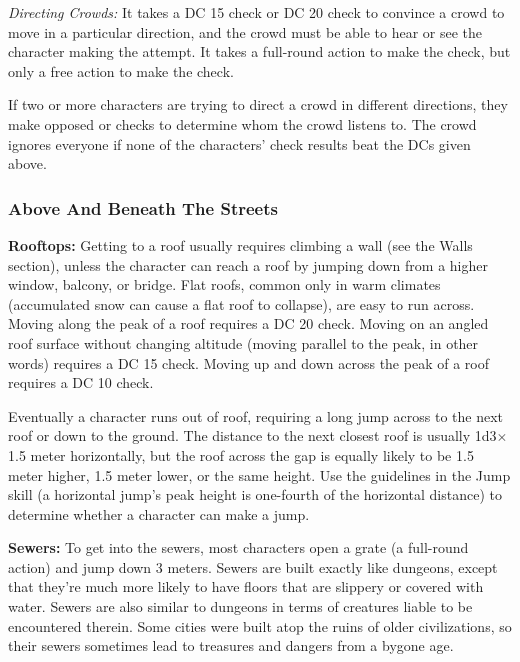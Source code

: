 \textit{Directing Crowds:} It takes a DC 15  check or DC 20  check to convince a crowd to move in a particular direction, and the crowd must be able to hear or see the character making the attempt. It takes a full-round action to make the  check, but only a free action to make the  check.

If two or more characters are trying to direct a crowd in different directions, they make opposed  or  checks to determine whom the crowd listens to. The crowd ignores everyone if none of the characters' check results beat the DCs given above.

\subsubsection{Above And Beneath The Streets}
\textbf{Rooftops:} Getting to a roof usually requires climbing a wall (see the Walls section), unless the character can reach a roof by jumping down from a higher window, balcony, or bridge. Flat roofs, common only in warm climates (accumulated snow can cause a flat roof to collapse), are easy to run across. Moving along the peak of a roof requires a DC 20  check. Moving on an angled roof surface without changing altitude (moving parallel to the peak, in other words) requires a DC 15  check. Moving up and down across the peak of a roof requires a DC 10  check.

Eventually a character runs out of roof, requiring a long jump across to the next roof or down to the ground. The distance to the next closest roof is usually 1d3$\times$1.5 meter horizontally, but the roof across the gap is equally likely to be 1.5 meter higher, 1.5 meter lower, or the same height. Use the guidelines in the Jump skill (a horizontal jump's peak height is one-fourth of the horizontal distance) to determine whether a character can make a jump.

\textbf{Sewers:} To get into the sewers, most characters open a grate (a full-round action) and jump down 3 meters. Sewers are built exactly like dungeons, except that they're much more likely to have floors that are slippery or covered with water. Sewers are also similar to dungeons in terms of creatures liable to be encountered therein. Some cities were built atop the ruins of older civilizations, so their sewers sometimes lead to treasures and dangers from a bygone age.

